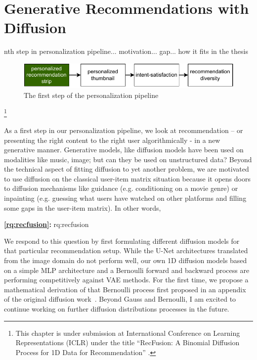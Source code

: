 
\acresetall

\chapter{Generative Recommendations with Diffusion}
\label{chapter:research-recfusion}

nth step in personalization pipeline...
motivation...
gap...
how it fits in the thesis
\fi

\begin{figure}[ht]
  \centering
  \includegraphics{images/pipeline_step1.pdf}
  \caption{The first step of the personalization pipeline}
  \label{fig:pip1}
\end{figure}

\footnote[]{This chapter is under submission at International Conference on Learning Representations (ICLR) under the title ``RecFusion: A Binomial Diffusion Process for 1D Data for Recommendation'' \cite{recfusion}.}
\acresetall

As a first step in our personalization pipeline, we look at recommendation – or presenting the right content to the right user algorithmically - in a new generative manner. Generative models, like diffusion models have been used on modalities like music, image; but can they be used on unstructured data? Beyond the technical aspect of fitting diffusion to yet another problem, we are motivated to use diffusion on the classical user-item matrix situation because it opens doors to diffusion mechanisms like guidance (e.g. conditioning on a movie genre) or inpainting (e.g. guessing what users have watched on other platforms and filling some gaps in the user-item matrix). In other words,

\medskip
\noindent
\textbf{\ref{rq:recfusion}:} \acl{rq:recfusion}
\medskip


We respond to this question by first formulating different diffusion models for that particular recommendation setup. While the U-Net architectures translated from the image domain \cite{DDPM} do not perform well, our own 1D diffusion models based on a simple MLP architecture and a Bernoulli forward and backward process are performing competitively against VAE methods. For the first time, we propose a mathematical derivation of that Bernoulli process first proposed in an appendix of the original diffusion work~\cite{jascha}. Beyond Gauss and Bernoulli, I am excited to continue working on further diffusion distributions processes in the future.



